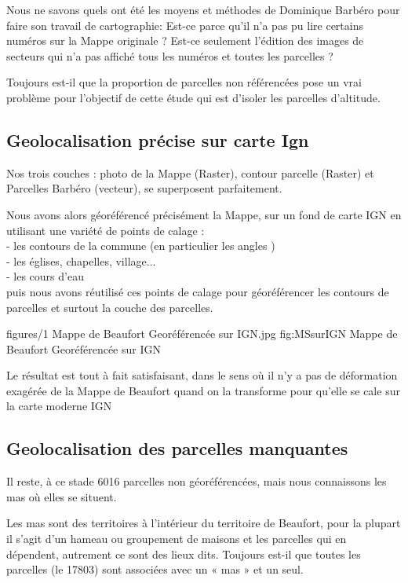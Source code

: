 Nous ne savons quels ont été les moyens et méthodes de Dominique Barbéro pour faire son travail de cartographie: Est-ce parce qu’il n’a pas pu lire certains numéros sur la Mappe originale ? Est-ce seulement l’édition des images de secteurs qui n’a pas affiché tous les numéros et toutes les parcelles ?

Toujours est-il que la proportion de parcelles non référencées pose un vrai problème pour l’objectif de cette étude qui est d’isoler les parcelles d’altitude.

\subsection{Geolocalisation précise sur carte Ign}

Nos trois couches :  photo de la Mappe (Raster), contour parcelle (Raster) et Parcelles Barbéro (vecteur), se superposent parfaitement.

Nous avons alors géoréférencé précisément la Mappe,  sur un fond de carte IGN en utilisant une variété de points de calage : \\
- les contours de la commune (en particulier les angles )\\
- les églises, chapelles, village...\\
- les cours d'eau\\
puis nous avons réutilisé ces points de calage pour géoréférencer les contours de parcelles et surtout la couche des parcelles.

\cartefigure
{figures/1 Mappe de Beaufort Georéférencée sur IGN.jpg}
{fig:MSsurIGN}
{Mappe de Beaufort Georéférencée sur IGN}

Le résultat est tout à fait satisfaisant, dans le sens où il n'y a pas de déformation exagérée de la Mappe de Beaufort quand on la transforme pour qu'elle se cale sur la carte moderne IGN

\subsection{Geolocalisation des parcelles manquantes}

Il reste, à ce stade 6016 parcelles non géoréférencées, mais nous connaissons les mas où elles se situent.

Les mas sont des territoires à l’intérieur du territoire de Beaufort, pour la plupart il s’agit d’un hameau ou groupement de maisons et les parcelles qui en dépendent, autrement ce sont des lieux dits. Toujours est-il que toutes les parcelles (le 17803) sont associées avec un « mas » et un seul.

